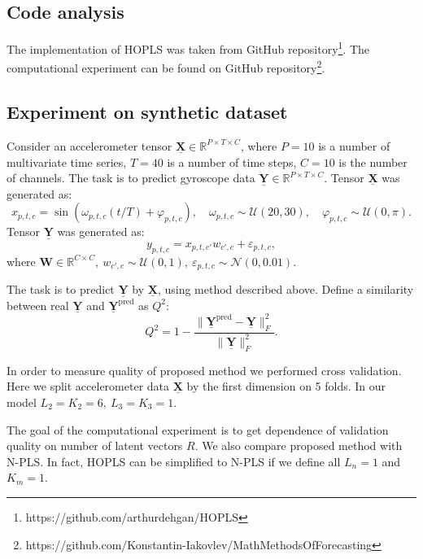 \documentclass[../../main.tex]{subfiles}
\begin{document}
\subsection{Code analysis}

The implementation of HOPLS was taken from GitHub repository\footnote{https://github.com/arthurdehgan/HOPLS}. The computational experiment can be found on GitHub repository\footnote{https://github.com/Konstantin-Iakovlev/MathMethodsOfForecasting}.

\subsection{Experiment on synthetic dataset}

Consider an accelerometer tensor $\underline{\mathbf{X}}\in \mathbb{R}^{P\times T \times C}$, where $P = 10$ is a number of multivariate time series, $T = 40$ is a number of time steps, $C = 10$ is the number of channels. The task is to predict gyroscope data $\underline{\mathbf{Y}} \in \mathbb{R}^{P\times T \times C}$. Tensor $\underline{\mathbf{X}}$ was generated as:
\begin{equation}
x_{p, t, c} = \sin(\omega_{p, t, c} (t / T) + \varphi_{p,t, c}), \quad \omega_{p, t, c} \sim \mathcal{U}(20, 30), \quad \varphi_{p, t, c} \sim \mathcal{U}(0, \pi).
\end{equation}
Tensor $\underline{\mathbf{Y}}$ was generated as:
\begin{equation}
y_{p,t,c} = x_{p,t,c'}w_{c', c} + \varepsilon_{p,t,c},
\end{equation}
where $\mathbf{W} \in \mathbb{R}^{C\times C}, ~w_{c', c}\sim \mathcal{U}(0, 1), ~\varepsilon_{p,t,c}\sim \mathcal{N}(0, 0.01)$.


The task is to predict $\underline{\mathbf{Y}}$ by $\underline{\mathbf{X}}$, using method described above. Define a similarity between real $\underline{\mathbf{Y}}$ and $\underline{\mathbf{Y}}^\text{pred}$ as $Q^2$:
\begin{equation}
Q^2 = 1 - \frac{\|\underline{\mathbf{Y}}^\text{pred} - \underline{\mathbf{Y}}\|_F^2}{\|\underline{\mathbf{Y}}\|_F^2}.
\end{equation}

In order to measure quality of proposed method we performed cross validation. Here we split accelerometer data $\underline{\mathbf{X}}$ by the first dimension on 5 folds. In our model $L_2 = K_2 = 6, ~L_3 = K_3 =1$.

The goal of the computational experiment is to get dependence of validation quality on number of latent vectors $R$. We also compare proposed method with N-PLS. In fact, HOPLS can be simplified to N-PLS if we define all $L_n = 1$ and $K_m = 1$. 
\end{document}
